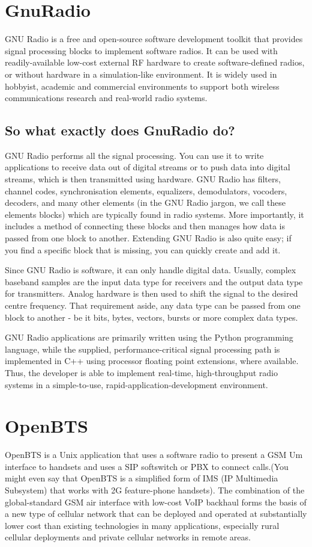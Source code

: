 \section{GnuRadio}
GNU Radio is a free and open-source software development toolkit that provides signal processing blocks to implement software radios. It can be used with readily-available low-cost external RF hardware to create software-defined radios, or without hardware in a simulation-like environment. It is widely used in hobbyist, academic and commercial environments to support both wireless communications research and real-world radio systems.
\subsection{So what exactly does GnuRadio do?}
GNU Radio performs all the signal processing. You can use it to write applications to receive data out of digital streams or to push data into digital streams, which is then transmitted using hardware. GNU Radio has filters, channel codes, synchronisation elements, equalizers, demodulators, vocoders, decoders, and many other elements (in the GNU Radio jargon, we call these elements blocks) which are typically found in radio systems. More importantly, it includes a method of connecting these blocks and then manages how data is passed from one block to another. Extending GNU Radio is also quite easy; if you find a specific block that is missing, you can quickly create and add it.

Since GNU Radio is software, it can only handle digital data. Usually, complex baseband samples are the input data type for receivers and the output data type for transmitters. Analog hardware is then used to shift the signal to the desired centre frequency. That requirement aside, any data type can be passed from one block to another - be it bits, bytes, vectors, bursts or more complex data types.

GNU Radio applications are primarily written using the Python programming language, while the supplied, performance-critical signal processing path is implemented in C++ using processor floating point extensions, where available. Thus, the developer is able to implement real-time, high-throughput radio systems in a simple-to-use, rapid-application-development environment.

\section{OpenBTS}
OpenBTS is a Unix application that uses a software radio to present a GSM Um interface to handsets and uses a SIP softswitch or PBX to connect calls.(You might even say that OpenBTS is a simplified form of IMS (IP Multimedia Subsystem) that works with 2G feature-phone handsets). The combination of the global-standard GSM air interface with low-cost VoIP backhaul forms the basis of a new type of cellular network that can be deployed and operated at substantially lower cost than existing technologies in many applications, especially rural cellular deployments and private cellular networks in remote areas. 
